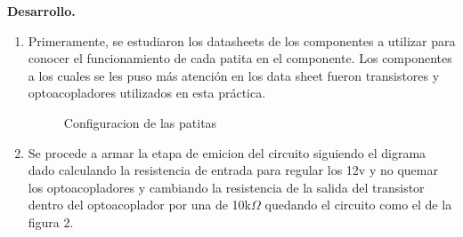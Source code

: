 \documentclass[letterpaper]{article}
\begin{document}
\begin{large}
    \begin{huge}
        \textbf{Desarrollo.}
    \end{huge}
    \begin{enumerate}
        \item Primeramente, se estudiaron los datasheets de los componentes a utilizar para conocer el funcionamiento de cada patita en el componente. Los componentes a los cuales se les puso más atención en los data sheet fueron transistores y optoacopladores utilizados en esta práctica.\\
        \begin{figure}[htbp]
            \centering
            \caption{Configuracion de las patitas}
            \label{fig:confpat}
        \end{figure}
        \item Se procede a armar la etapa de emicion del circuito siguiendo el digrama dado calculando la resistencia de entrada para regular los 12v y no quemar los optoacopladores y cambiando la resistencia de la salida del transistor dentro del optoacoplador por una de 10k$\Omega$ quedando el circuito como el de la figura 2.\\\\

\end{enumerate}
\end{large}
\end{document}
